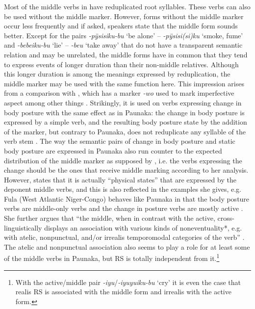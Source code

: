 Most of the middle verbs in  have reduplicated root syllables. These verbs can also be used without the middle marker. However, forms without the middle marker occur less frequently and if asked, speakers state that the middle form sounds better. Except for the pairs \textit{-pÿsisiku-bu} ‘be alone’ – \textit{-pÿsisi(si)ku} ‘smoke, fume’ and \mbox{\textit{-bebeiku-bu}} ‘lie’ – \textit{-beu} ‘take away’ that do not have a transparent semantic relation and may be unrelated, the middle forms have in common that they tend to express events of longer duration than their non-middle relatives. Although this longer duration is among the meanings expressed by reduplication, the middle marker may be used with the same function here. This impression arises from a comparison with , which has a marker \textit{-wo} used to mark imperfective aspect among other things \citep[258]{Danielsen2007}. Strikingly, it is used on verbs expressing change in body posture with the same effect as in Paunaka: the change in body posture is expressed by a simple verb, and the resulting body posture state by the addition of the marker, but contrary to Paunaka,  does not reduplicate any syllable of the verb stem \citep[cf.][260]{Danielsen2007}. The way the semantic pairs of change in body posture and static body posture are expressed in Paunaka also run counter to the expected distribution of the middle marker as supposed by \citet[55--56]{Kemmer1993}, i.e. the verbs expressing the change should be the ones that receive middle marking according to her analysis. However, \citet[45]{Klaiman1991} states that it is actually “physical states” that are expressed by the deponent middle verbs, and this is also reflected in the examples she gives, e.g. Fula (West Atlantic Niger-Congo) behaves like Paunaka in that the body posture verbs are middle-only verbs and the change in posture verbs are mostly active \citep[cf.][58]{Klaiman1991}. She further argues that “the middle, when in contrast with the active, cross-linguistically displays an association with various kinds of noneventuality*, e.g. with atelic, nonpunctual, and/or irrealis temporomodal categories of the verb” \citep[105]{Klaiman1991}. The atelic and nonpunctual association also seems to play a role for at least some of the middle verbs in Paunaka, but RS is totally independent from it.\footnote{With the active/middle pair \textit{-iyu}/\textit{-iyuyuiku-bu} ‘cry’ it is even the case that realis RS is associated with the middle form and irrealis with the active form.}

